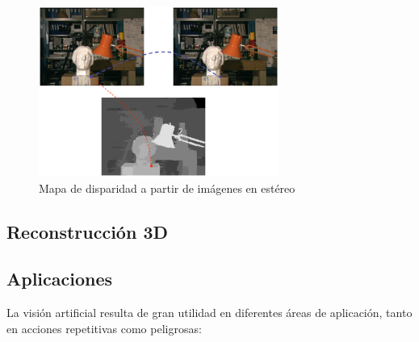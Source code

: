 \begin{figure}[!th]
  \begin{center}
    \includegraphics[width=0.7\textwidth]{images/cap2/MapaDisparidad.eps}
    \caption{Mapa de disparidad a partir de imágenes en estéreo}
    \label{fig:MapaDisparidad}
  \end{center}
\end{figure}










\subsection{Reconstrucción 3D}

\subsection{Aplicaciones}
La visión artificial resulta de gran utilidad en diferentes áreas de
aplicación, tanto en acciones repetitivas como peligrosas:


